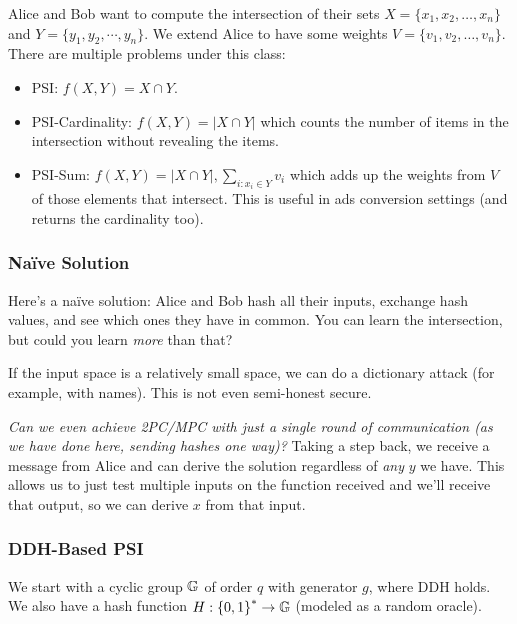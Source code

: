 
Alice and Bob want to compute the intersection of their sets $X = \{x_1, x_2, \dots, x_n\}$ and $Y = \{y_1, y_2, \cdots, y_n\}$. We extend Alice to have some weights $V = \{v_1, v_2, \dots, v_n\}$. There are multiple problems under this class:
\begin{itemize}
    \item PSI: $f(X, Y) = X\cap Y$.
    \item PSI-Cardinality: $f(X, Y) = |X\cap Y|$ which counts the number of items in the intersection without revealing the items.
    \item PSI-Sum: $f(X, Y) = |X\cap Y|, \sum_{i: x_i\in Y}v_i$ which adds up the weights from $V$ of those elements that intersect. This is useful in ads conversion settings (and returns the cardinality too).
\end{itemize}

\subsubsection{Na\"ive Solution}
Here's a na\"ive solution: Alice and Bob hash all their inputs, exchange hash values, and see which ones they have in common. You can learn the intersection, but could you learn \emph{more} than that?


If the input space is a relatively small space, we can do a dictionary attack (for example, with names). This is not even semi-honest secure.

\emph{Can we even achieve 2PC/MPC with just a single round of communication (as we have done here, sending hashes one way)?} Taking a step back, we receive a message from Alice and can derive the solution regardless of \emph{any} $y$ we have. This allows us to just test multiple inputs on the function received and we'll receive that output, so we can derive $x$ from that input.

\subsubsection{DDH-Based PSI}
We start with a cyclic group $\mathbb G$ of order $q$ with generator $g$, where DDH holds. We also have a hash function $H: \left\{ 0, 1 \right\}^{*}\to \mathbb G$ (modeled as a random oracle).


